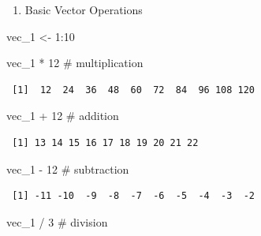 \documentclass[
  letterpaper,
  DIV=11,
  numbers=noendperiod]{scrreprt}
\newenvironment{Shaded}{\begin{snugshade}}{\end{snugshade}}
\newcommand{\CommentTok}[1]{\textcolor[rgb]{0.37,0.37,0.37}{#1}}
\newcommand{\DecValTok}[1]{\textcolor[rgb]{0.68,0.00,0.00}{#1}}
\newcommand{\NormalTok}[1]{\textcolor[rgb]{0.00,0.23,0.31}{#1}}
\newcommand{\OtherTok}[1]{\textcolor[rgb]{0.00,0.23,0.31}{#1}}
\newcommand{\SpecialCharTok}[1]{\textcolor[rgb]{0.37,0.37,0.37}{#1}}
\providecommand{\tightlist}{%
  \setlength{\itemsep}{0pt}\setlength{\parskip}{0pt}}\usepackage{longtable,booktabs,array}
\begin{document}
\begin{enumerate}
\def\labelenumi{\arabic{enumi}.}
\tightlist
\item
  Basic Vector Operations
\end{enumerate}

\begin{Shaded}
\begin{Highlighting}[]
\NormalTok{vec\_1 }\OtherTok{\textless{}{-}} \DecValTok{1}\SpecialCharTok{:}\DecValTok{10}
\end{Highlighting}
\end{Shaded}

\begin{Shaded}
\begin{Highlighting}[]
\NormalTok{vec\_1 }\SpecialCharTok{*} \DecValTok{12} \CommentTok{\# multiplication}
\end{Highlighting}
\end{Shaded}

\begin{verbatim}
 [1]  12  24  36  48  60  72  84  96 108 120
\end{verbatim}

\begin{Shaded}
\begin{Highlighting}[]
\NormalTok{vec\_1 }\SpecialCharTok{+} \DecValTok{12} \CommentTok{\# addition}
\end{Highlighting}
\end{Shaded}

\begin{verbatim}
 [1] 13 14 15 16 17 18 19 20 21 22
\end{verbatim}

\begin{Shaded}
\begin{Highlighting}[]
\NormalTok{vec\_1 }\SpecialCharTok{{-}} \DecValTok{12} \CommentTok{\# subtraction}
\end{Highlighting}
\end{Shaded}

\begin{verbatim}
 [1] -11 -10  -9  -8  -7  -6  -5  -4  -3  -2
\end{verbatim}

\begin{Shaded}
\begin{Highlighting}[]
\NormalTok{vec\_1 }\SpecialCharTok{/} \DecValTok{3} \CommentTok{\# division}
\end{Highlighting}
\end{Shaded}
\end{document}
